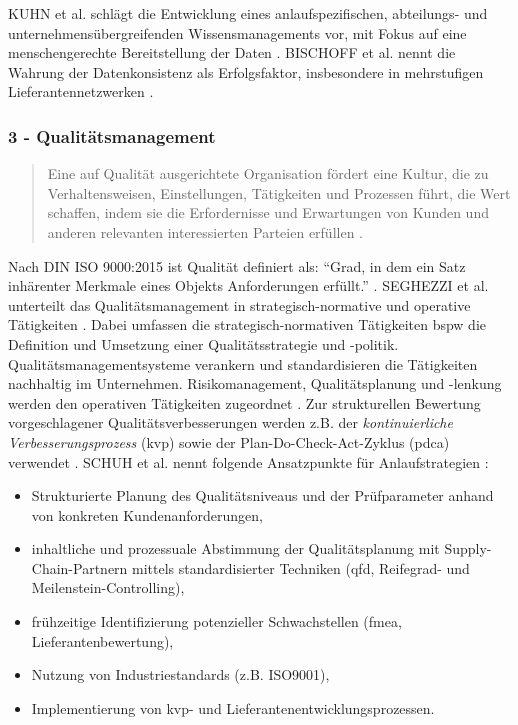 KUHN et al. schlägt die Entwicklung eines anlaufspezifischen, abteilungs- und unternehmensübergreifenden Wissensmanagements vor, mit Fokus auf eine menschengerechte Bereitstellung der Daten \autocite{Kuhn2002}. 
BISCHOFF et al. nennt die Wahrung der Datenkonsistenz als Erfolgsfaktor, insbesondere in mehrstufigen Lieferantennetzwerken \autocite{Bischoff2007}. 

\subsubsection*{3 - Qualitätsmanagement}
\begin{quotation}
 Eine auf Qualität ausgerichtete Organisation fördert eine Kultur, die zu Verhaltensweisen, Einstellungen, Tätigkeiten und Prozessen führt, die Wert schaffen, indem sie die Erfordernisse und Erwartungen von Kunden und anderen relevanten interessierten Parteien erfüllen \autocite[10]{ISO9000}. %
\end{quotation}

Nach DIN ISO 9000:2015 ist Qualität definiert als: ``Grad, in dem ein Satz inhärenter Merkmale eines Objekts Anforderungen erfüllt.'' \autocite[39]{ISO9000}. %
SEGHEZZI et al. unterteilt das Qualitätsmanagement in strategisch-normative und operative Tätigkeiten \autocite{Seghezzi2013}. 
Dabei umfassen die strategisch-normativen Tätigkeiten \gls{bspw} die Definition und Umsetzung einer Qualitätsstrategie und -politik. Qualitätsmanagementsysteme verankern und standardisieren die Tätigkeiten nachhaltig im Unternehmen. 
Risikomanagement, Qualitätsplanung und -lenkung werden den operativen Tätigkeiten zugeordnet \autocite{Seghezzi2013}. 
Zur strukturellen Bewertung vorgeschlagener Qualitätsverbesserungen werden z.B. der \textit{kontinuierliche Verbesserungsprozess} (\gls{kvp}) sowie der Plan-Do-Check-Act-Zyklus (\gls{pdca}) verwendet \autocite[17]{Schuh2008}.
% 
SCHUH et al. nennt folgende Ansatzpunkte für Anlaufstrategien \autocite[17]{Schuh2008}: 
\begin{itemize}
 \item Strukturierte Planung des Qualitätsniveaus und der Prüfparameter anhand von konkreten Kundenanforderungen,
 \item inhaltliche und prozessuale Abstimmung der Qualitätsplanung mit Supply-Chain-Partnern mittels standardisierter Techniken (\gls{qfd}, Reifegrad- und Meilenstein-Controlling),
 \item frühzeitige Identifizierung potenzieller Schwachstellen (\gls{fmea}, Lieferantenbewertung),
 \item Nutzung von Industriestandards (z.B. ISO9001),
 \item Implementierung von \gls{kvp}- und Lieferantenentwicklungsprozessen.
\end{itemize}

